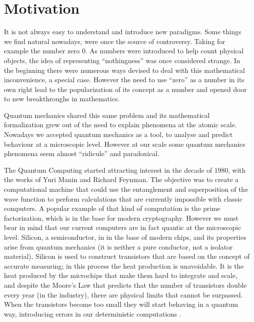 \section{Motivation}
\label{sec:int_motivation}



It is not always easy to understand and introduce new paradigms. Some things we find natural nowadays, were once the source of controversy. Taking for example the number zero $0$. As numbers were introduced to help count physical objects, the idea of representing ``nothingness'' was once considered strange. In the beginning there were numerous ways devised to deal with this mathematical inconvenience, a special case. However the need to use ``zero'' as a number in its own right lead to the popularization of its concept as a number and opened door to new breakthroughs in mathematics\cite{Kaplan2000}. 

Quantum mechanics shared this same problem and its mathematical formalization grew out of the need to explain phenomena at the atomic scale\cite{Mehra1982}. Nowadays we  accepted quantum mechanics as a tool, to analyse and predict behaviour at a microscopic level. However at our scale some quantum mechanics phenomena seem almost ``ridicule'' and paradoxical.

The Quantum Computing started attracting interest in the decade of $1980$, with the works of Yuri Manin and Richard Feynman. The objective was to create a computational machine that could use the entanglement and superposition of the wave function to perform calculations that are currently impossible with classic computers. A popular example of that kind of computation is the prime factorization, which is in the base for modern cryptography. 
However we must bear in mind that our current computers are in fact quantic at the microscopic level. 
Silicon, a semiconductor, in in the base of modern chips, and its properties arise from quantum mechanics (it is neither a pure conductor, not a isolator material). Silicon is used to construct transistors that are based on the concept of accurate measuring; in this process the heat production is unavoidable. It is the heat produced by the microchips that make them hard to integrate and scale, and despite the Moore's Law that predicts that the number of transistors double every year (in the industry), there are physical limits that cannot be surpassed. When the transistors become too small they will start behaving in a quantum way, introducing errors in our deterministic computations \cite{Laughlin2005}.







